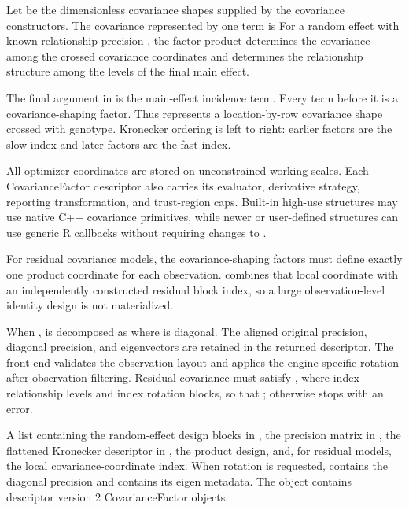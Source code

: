 \documentclass[a4paper]{book}
\begin{document}
%
\begin{Details}\relax
Let  be the dimensionless covariance shapes supplied by
the covariance constructors.  The covariance represented by one 
term is
For a random effect with known relationship precision , the factor
product determines the covariance among the crossed covariance coordinates and
 determines the relationship structure among the levels of the final
main effect.

The final argument in  is the main-effect incidence term.  Every term
before it is a covariance-shaping factor.  Thus
 represents a
location-by-row covariance shape crossed with genotype.  Kronecker ordering is
left to right: earlier factors are the slow index and later factors are the fast
index.

All optimizer coordinates are stored on unconstrained working scales.  Each
CovarianceFactor descriptor also carries its evaluator, derivative strategy,
reporting transformation, and trust-region caps.  Built-in high-use structures
may use native C++ covariance primitives, while newer or user-defined
structures can use generic R callbacks without requiring changes to
.

For residual covariance models, the covariance-shaping factors must define
exactly one product coordinate for each observation.   combines
that local coordinate with an independently constructed residual block index,
so a large observation-level identity design is not materialized.

When ,  is decomposed as
where \eqn{\Lambda}{} is diagonal. The aligned original precision, diagonal
precision, and eigenvectors are retained in the returned descriptor. The
 front end validates the observation layout and applies the
engine-specific rotation after observation filtering. Residual covariance
must satisfy , where  index
relationship levels and  index rotation blocks, so that
; otherwise  stops with an error.
\end{Details}
%
\begin{Value}
A list containing the random-effect design blocks in , the precision
matrix in , the flattened Kronecker descriptor in ,
the product design, and, for residual models, the local covariance-coordinate
index. When rotation is requested,  contains the diagonal
precision and  contains its eigen metadata. The
 object contains descriptor version 2
CovarianceFactor objects.
\end{Value}
\end{document}
